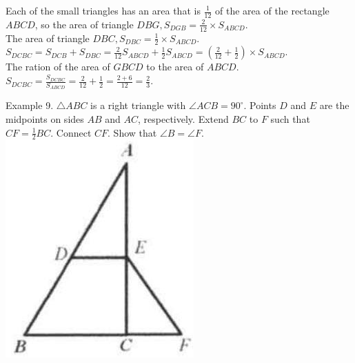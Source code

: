 \documentclass[10pt]{article}
\begin{document}
Each of the small triangles has an area that is \(\frac{1}{12}\) of the area of the rectangle \(A B C D\), so the area of triangle \(D B G, S_{D G B}=\frac{2}{12} \times S_{A B C D}\).\\
The area of triangle \(D B C, S_{D B C}=\frac{1}{2} \times S_{A B C D}\).\\
\(S_{D C B C}=S_{D C B}+S_{D B C}=\frac{2}{12} S_{A B C D}+\frac{1}{2} S_{A B C D}=\left(\frac{2}{12}+\frac{1}{2}\right) \times S_{A B C D}\).\\
The ration of the area of \(G B C D\) to the area of \(A B C D\).\\
\(S_{D C B C}=\frac{S_{D C B C}}{S_{A B C D}}=\frac{2}{12}+\frac{1}{2}=\frac{2+6}{12}=\frac{2}{3}\).

Example 9. \(\triangle A B C\) is a right triangle with \(\angle A C B=90^{\circ}\). Points \(D\) and \(E\) are the midpoints on sides \(A B\) and \(A C\), respectively. Extend \(B C\) to \(F\) such that \(C F=\frac{1}{2} B C\). Connect \(C F\). Show that \(\angle B=\angle F\).\\
\includegraphics[max width=\textwidth, center]{2025_04_17_97bc1f7e44d93c271a88g-011(2)}
\end{document}
